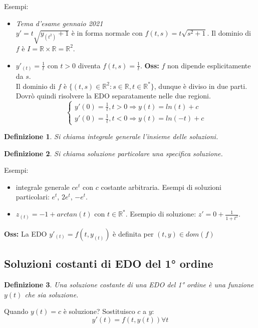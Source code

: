 \documentclass{scrreprt}
\newtheorem{defn}{Definizione}
\newenvironment{definition}{\begin{mdframed}[backgroundcolor=Ivory2]\begin{defn}}{\end{defn}\end{mdframed}}
\begin{document}
Esempi:
\begin{itemize}
	\item \emph{Tema d'esame gennaio 2021}\\$y' = t \sqrt{y_{(t^2)}+1}$ è in forma normale con $f(t,s) = t \sqrt{s^2+1}$. Il dominio di $f$ è $I = \mathbb{R} \times \mathbb{R} = \mathbb{R}^2$.
	\item $y'_{(t)} = \frac{1}{t}$ con $t>0$ diventa $f(t,s) = \frac{1}{t}$. \textbf{Oss:} $f$ non dipende esplicitamente da $s$. \\ Il dominio di $f$ è $\{(t,s) \in \mathbb{R}^2 : s\in\mathbb{R}, t\in\mathbb{R}^* \}$, dunque è diviso in due parti.
			Dovrò quindi risolvere la EDO separatamente nelle due regioni.
			$$ \left\{\begin{array}{lr} y'(0)=\frac{1}{t},	t>0 \Rightarrow y(t) = ln(t)+c\\ y'(0)=\frac{1}{t},	t<0 \Rightarrow y(t) = ln(-t)+c \end{array}\right. $$
\end{itemize}
\begin{definition}
	Si chiama \emph{integrale generale} l'insieme delle soluzioni.
\end{definition}
\begin{definition}
	Si chiama \emph{soluzione particolare} una specifica soluzione.
\end{definition}
Esempi:
\begin{itemize}
	\item integrale generale $ce^t$ con $c$ costante arbitraria. Esempi di soluzioni particolari: $e^t$, $2e^t$, $-e^t$.
	\item $z_{(t)} = -1 + arctan(t)$ con $t\in\mathbb{R}^*$. Esempio di soluzione: $z' = 0 + \frac{1}{1+t^2}$.
\end{itemize}
\textbf{Oss:} La EDO $y'_{(t)} = f(t,y_{(t)})$ è definita per $(t,y)\in dom(f)$

\subsection{Soluzioni costanti di EDO del 1° ordine}
\begin{definition}
	Una soluzione costante di una EDO del 1° ordine è una funzione $y(t)$ che sia soluzione.
\end{definition}
Quando $y(t)=c$ è soluzione? Sostituisco $c$ a $y$:
\begin{equation}
	y'(t) = f(t,y(t)) \forall t
\end{equation}
\end{document}
